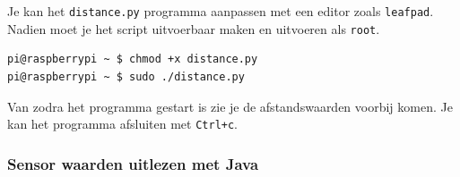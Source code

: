 \documentclass[a4paper]{article}
\begin{document}
  Je kan het \texttt{distance.py} programma aanpassen met een editor
zoals \texttt{leafpad}.  Nadien moet je het script uitvoerbaar maken
en uitvoeren als \texttt{root}.

\begin{lstlisting}
pi@raspberrypi ~ $ chmod +x distance.py
pi@raspberrypi ~ $ sudo ./distance.py
\end{lstlisting}

  Van zodra het programma gestart is zie je de afstandswaarden voorbij
komen.  Je kan het programma afsluiten met \texttt{Ctrl+c}.

    \subsubsection{Sensor waarden uitlezen met Java}
\end{document}

